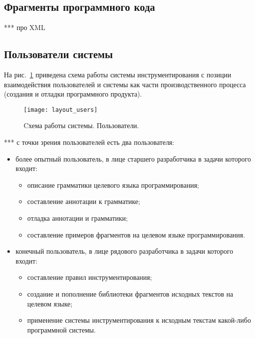 \subsection{Фрагменты программного кода}

***
про XML

\subsection{Пользователи системы}

На рис.~\ref{fig:layout_users} приведена схема работы системы инструментирования с позиции взаимодействия пользователей и системы как части производственного процесса (создания и отладки программного продукта).

\begin{figure}[h]
	\centering
	\texttt{[image: layout\_users]}
	\caption{Cхема работы системы. Пользователи.}
	\label{fig:layout_users}
\end{figure}

***
с точки зрения пользователей есть два пользователя:

\begin{itemize}
  \item более опытный пользователь, в лице старшего разработчика в задачи которого входит:
    \begin{itemize}
      \item описание грамматики целевого языка программирования;
      \item составление аннотации к грамматике;
      \item отладка аннотации и грамматики;
      \item составление примеров фрагментов на целевом языке программирования.
    \end{itemize}

  \item конечный пользователь, в лице рядового разработчика в задачи которого входит:
    \begin{itemize}
      \item составление правил инструментирования;
      \item создание и пополнение библиотеки фрагментов исходных текстов на целевом языке;
      \item применение системы инструментирования к исходным текстам какой-либо программной системы.
    \end{itemize}
\end{itemize}

